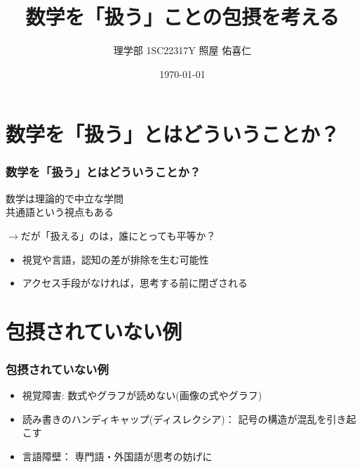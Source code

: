 \documentclass[dvipdfmx,cjk]{beamer}
\theoremstyle{example}
\begin{document}
\title[]{数学を「扱う」ことの包摂を考える}
\author[]{理学部 1SC22317Y 照屋 佑喜仁}
\institute[]{}
\date{\today}

\begin{frame}
    \titlepage
\end{frame}

\begin{frame}
    \tableofcontents
\end{frame}

\section{数学を「扱う」とはどういうことか？}
\begin{frame}
    \frametitle{数学を「扱う」とはどういうことか？}
    数学は理論的で中立な学問\\
    共通語という視点もある

    $\longrightarrow$だが「扱える」のは，誰にとっても平等か？

    \begin{itemize}
        \item 視覚や言語，認知の差が排除を生む可能性
        \item アクセス手段がなければ，思考する前に閉ざされる
    \end{itemize}
\end{frame}

\section{包摂されていない例}
\begin{frame}
    \frametitle{包摂されていない例}
    \begin{itemize}
        \item 視覚障害: 数式やグラフが読めない(画像の式やグラフ)
        \item 読み書きのハンディキャップ(ディスレクシア)： 記号の構造が混乱を引き起こす
        \item 言語障壁： 専門語・外国語が思考の妨げに
    \end{itemize}
\end{frame}
\end{document}
